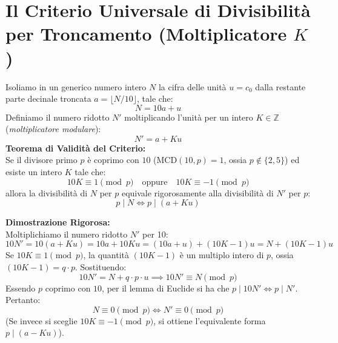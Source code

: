 \documentclass[11pt,a4paper,oneside]{report}
\begin{document}
\section{Il Criterio Universale di Divisibilit\`a per Troncamento (Moltiplicatore \texorpdfstring{$K$}{K})}
\begin{definizione}
Isoliamo in un generico numero intero $N$ la cifra delle unit\`a $u = c_0$ dalla restante parte decinale troncata $a = \lfloor N/10 \rfloor$, tale che:
\[
N = 10a + u
\]
Definiamo il numero ridotto $N'$ moltiplicando l'unit\`a per un intero $K \in \mathbb{Z}$ (\textit{moltiplicatore modulare}):
\[
N' = a + K u
\]
\textbf{Teorema di Validit\`a del Criterio:}\\
Se il divisore primo $p$ \`e coprimo con $10$ ($\mathrm{MCD}(10, p) = 1$, ossia $p \notin \{2, 5\}$) ed esiste un intero $K$ tale che:
\[
10K \equiv 1 \pmod p \quad \text{oppure} \quad 10K \equiv -1 \pmod p
\]
allora la divisibilit\`a di $N$ per $p$ equivale rigorosamente alla divisibilit\`a di $N'$ per $p$:
\[
p \mid N \iff p \mid (a + K u)
\]
\end{definizione}

\noindent
\textbf{Dimostrazione Rigorosa:}\\
Moltiplichiamo il numero ridotto $N'$ per 10:
\[
10 N' = 10(a + Ku) = 10a + 10Ku = (10a + u) + (10K - 1)u = N + (10K - 1)u
\]
Se $10K \equiv 1 \pmod p$, la quantit\`a $(10K - 1)$ \`e un multiplo intero di $p$, ossia $(10K - 1) = q \cdot p$. Sostituendo:
\[
10 N' = N + q \cdot p \cdot u \implies 10 N' \equiv N \pmod p
\]
Essendo $p$ coprimo con $10$, per il lemma di Euclide si ha che $p \mid 10 N' \iff p \mid N'$. Pertanto:
\[
N \equiv 0 \pmod p \iff N' \equiv 0 \pmod p
\]
(Se invece si sceglie $10K \equiv -1 \pmod p$, si ottiene l'equivalente forma $p \mid (a - Ku)$).
\end{document}
